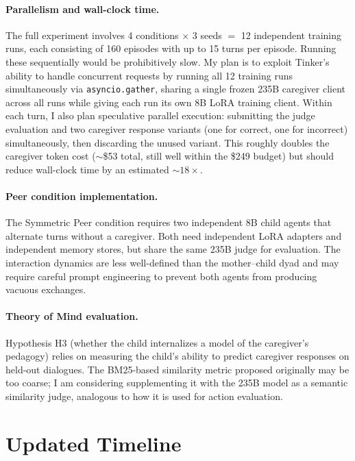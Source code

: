 \documentclass[11pt]{article}
\begin{document}
\paragraph{Parallelism and wall-clock time.} The full experiment involves 4 conditions $\times$ 3 seeds $=$ 12 independent training runs, each consisting of 160 episodes with up to 15 turns per episode. Running these sequentially would be prohibitively slow. My plan is to exploit Tinker's ability to handle concurrent requests by running all 12 training runs simultaneously via \texttt{asyncio.gather}, sharing a single frozen 235B caregiver client across all runs while giving each run its own 8B LoRA training client. Within each turn, I also plan speculative parallel execution: submitting the judge evaluation and two caregiver response variants (one for correct, one for incorrect) simultaneously, then discarding the unused variant. This roughly doubles the caregiver token cost ($\sim$\$53 total, still well within the \$249 budget) but should reduce wall-clock time by an estimated ${\sim}18\times$.

\paragraph{Peer condition implementation.} The Symmetric Peer condition requires two independent 8B child agents that alternate turns without a caregiver. Both need independent LoRA adapters and independent memory stores, but share the same 235B judge for evaluation. The interaction dynamics are less well-defined than the mother--child dyad and may require careful prompt engineering to prevent both agents from producing vacuous exchanges.

\paragraph{Theory of Mind evaluation.} Hypothesis H3 (whether the child internalizes a model of the caregiver's pedagogy) relies on measuring the child's ability to predict caregiver responses on held-out dialogues. The BM25-based similarity metric proposed originally may be too coarse; I am considering supplementing it with the 235B model as a semantic similarity judge, analogous to how it is used for action evaluation.

\section{Updated Timeline}
\end{document}

